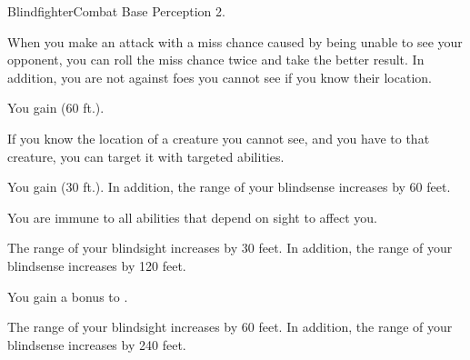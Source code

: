     \begin{feat}{Blindfighter}{Combat}
        \featpre Base Perception 2.

         When you make an attack with a miss chance caused by being unable to see your opponent, you can roll the miss chance twice and take the better result.
        In addition, you are not \partiallyunaware against foes you cannot see if you know their location.

         You gain  (60 ft.).

         If you know the location of a creature you cannot see, and you have  to that creature, you can target it with targeted abilities.

         You gain  (30 ft.).
        In addition, the range of your blindsense increases by 60 feet.

         You are immune to all abilities that depend on sight to affect you.

         The range of your blindsight increases by 30 feet.
        In addition, the range of your blindsense increases by 120 feet.

         You gain a  bonus to .

         The range of your blindsight increases by 60 feet.
        In addition, the range of your blindsense increases by 240 feet.
    \end{feat}

